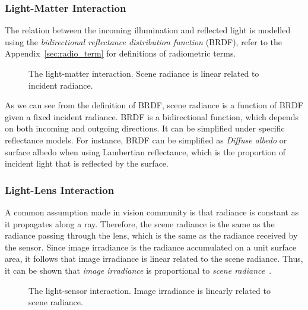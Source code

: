 \subsubsection{Light-Matter Interaction}
The relation between the incoming illumination and reflected light is modelled using the \textit{bidirectional reflectance distribution function} (BRDF), refer to the Appendix~\ref{sec:radio_term} for definitions of radiometric terms.
\begin{figure}[!htbp]
\centering
{}
\caption{The light-matter interaction. Scene radiance is linear related to incident radiance.}
\label{fig:light_matter_interact}
\end{figure}

As we can see from the definition of BRDF, scene radiance is a function of BRDF given a fixed incident radiance. BRDF is a bidirectional function, which depends on both incoming and outgoing directions. It can be simplified under specific reflectance models. For instance, BRDF can be simplified as \textit{Diffuse albedo} or surface albedo when using Lambertian reflectance, which is the proportion of incident light that is reflected by the surface.

\subsubsection{Light-Lens Interaction}
A common assumption made in vision community is that radiance is constant as it propagates along a ray. Therefore, the scene radiance is the same as the radiance passing through the lens, which is the same as the radiance received by the sensor. Since image irradiance is the radiance accumulated on a unit surface area, it follows that image irradiance is linear related to the scene radiance. Thus, it can be shown that \textit{image irradiance} is proportional to \textit{scene radiance}~\cite{forsyth2011computer}.
\begin{figure}[!ht]
\centering
{}
\caption{The light-sensor interaction. Image irradiance is linearly related to scene radiance.}
\label{fig:light_lens_interact}
\end{figure}

